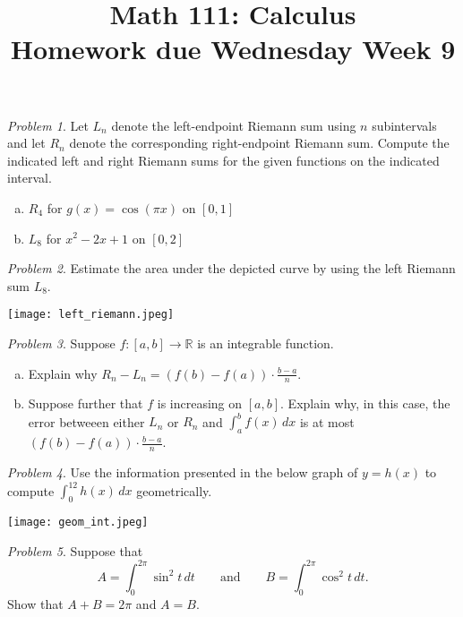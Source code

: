 \documentclass[11pt,twoside]{amsart}
\title{Math 111: Calculus\\ Homework due Wednesday Week 9}
\theoremstyle{plain}
\theoremstyle{remark}
\newtheorem{prob}{Problem}
\theoremstyle{definition}
\theoremstyle{definition}
\newcommand{\RR}{\mathbb{R}}
\begin{document}
\maketitle

\begin{prob}
Let $L_n$ denote the left-endpoint Riemann sum using $n$ subintervals and let $R_n$ denote the corresponding right-endpoint Riemann sum. Compute the indicated left and right Riemann sums for the given functions on the indicated interval.
\begin{enumerate}[(a)]
\item $R_4$ for $g(x) = \cos(\pi x)$ on $[0,1]$
\item $L_8$ for $x^2-2x+1$ on $[0,2]$
\end{enumerate}
\end{prob}


\begin{prob}
Estimate the area under the depicted curve by using the left Riemann sum $L_8$.
\begin{center}
\texttt{[image: left\_riemann.jpeg]}
\end{center}
\end{prob}

\begin{prob}
Suppose $f\colon [a,b]\to \RR$ is an integrable function.
\begin{enumerate}[(a)]
\item Explain why $R_n-L_n = (f(b)-f(a))\cdot \frac{b-a}{n}$.
\item Suppose further that $f$ is increasing on $[a,b]$. Explain why, in this case, the error betweeen either $L_n$ or $R_n$ and $\int_a^b f(x)\,dx$ is at most $(f(b)-f(a))\cdot \frac{b-a}{n}$.
\end{enumerate}
\end{prob}

\begin{prob}
Use the information presented in the below graph of $y=h(x)$ to compute $\int_0^{12}h(x)\,dx$ geometrically.
\begin{center}
\texttt{[image: geom\_int.jpeg]}
\end{center}
\end{prob}

\begin{prob}
Suppose that
\[
  A = \int_0^{2\pi} \sin^2t\,dt\qquad\text{and}\qquad B = \int_0^{2\pi} \cos^2t\,dt.
\]
Show that $A+B=2\pi$ and $A=B$.
\end{prob}
\end{document}
